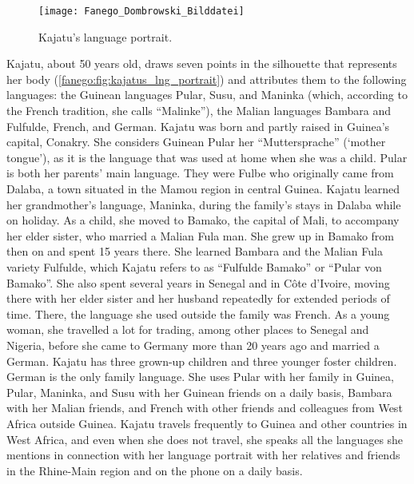 \documentclass[output=paper]{langscibook}
\begin{document}
\begin{figure}
    \texttt{[image: Fanego\_Dombrowski\_Bilddatei]}
    \caption{Kajatu’s language portrait.}
    \label{fanego:fig:kajatus_lng_portrait}
\end{figure}

\noindent
Kajatu, about 50 years old, draws seven points in the silhouette that represents her body (\autoref{fanego:fig:kajatus_lng_portrait}) and attributes them to the following languages: the Guinean languages Pular, Susu, and Maninka (which, according to the French tradition, she calls “Malinke”), the Malian languages Bambara and Fulfulde, French, and German. Kajatu was born and partly raised in Guinea’s capital, Conakry. She considers Guinean Pular her “Muttersprache” (‘mother tongue’), as it is the language that was used at home when she was a child. Pular is both her parents’ main language. They were Fulbe who originally came from Dalaba, a town situated in the Mamou region in central Guinea. Kajatu learned her grandmother’s language, Maninka, during the family’s stays in Dalaba while on holiday. As a child, she moved to Bamako, the capital of Mali, to accompany her elder sister, who married a Malian Fula man. She grew up in Bamako from then on and spent 15 years there. She learned Bambara and the Malian Fula variety Fulfulde, which Kajatu refers to as “Fulfulde Bamako” or “Pular von Bamako”. She also spent several years in Senegal and in Côte d'Ivoire, moving there with her elder sister and her husband repeatedly for extended periods of time. There, the language she used outside the family was French. As a young woman, she travelled a lot for trading, among other places to Senegal and Nigeria, before she came to Germany more than 20 years ago and married a German. Kajatu has three grown-up children and three younger foster children. German is the only family language. She uses Pular with her family in Guinea, Pular, Maninka, and Susu with her Guinean friends on a daily basis, Bambara with her Malian friends, and French with other friends and colleagues from West Africa outside Guinea. Kajatu travels frequently to Guinea and other countries in West Africa, and even when she does not travel, she speaks all the languages she mentions in connection with her language portrait with her relatives and friends in the Rhine-Main region and on the phone on a daily basis. 
\end{document}
